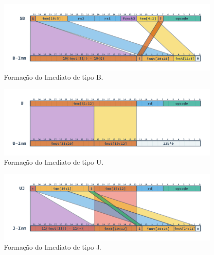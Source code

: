         \begin{figure}[H]
        \centering
            \includegraphics[width=1\linewidth]{figs/RV_B_Imm.png}
            \caption{Formação do Imediato de tipo B.}\label{fig:riscv_b_imm}
        \end{figure}

        \begin{figure}[H]
        \centering
            \includegraphics[width=1\linewidth]{figs/RV_U_Imm.png}
            \caption{Formação do Imediato de tipo U.}\label{fig:riscv_u_imm}
        \end{figure}

        \begin{figure}[H]
        \centering
            \includegraphics[width=1\linewidth]{figs/RV_J_Imm.png}
            \caption{Formação do Imediato de tipo J.}\label{fig:riscv_j_imm}
        \end{figure}


